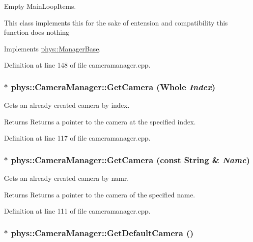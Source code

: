 Empty MainLoopItems. 

This class implements this for the sake of entension and compatibility this function does nothing 

Implements \hyperlink{classphys_1_1ManagerBase_aa9e13a3f7c398b708f0f242610b5abf7}{phys::ManagerBase}.



Definition at line 148 of file cameramanager.cpp.

\hypertarget{classphys_1_1CameraManager_a5147ab2269311bec15100953b7505d4b}{
\subsubsection[{GetCamera}]{ $\ast$ phys::CameraManager::GetCamera ({\bf Whole} {\em Index})}}
\label{d9/d91/classphys_1_1CameraManager_a5147ab2269311bec15100953b7505d4b}


Gets an already created camera by index. 

\begin{DoxyReturn}{Returns}
Returns a pointer to the camera at the specified index. 
\end{DoxyReturn}


Definition at line 117 of file cameramanager.cpp.

\hypertarget{classphys_1_1CameraManager_ad247bd3789c579cba5edb4c00848ac7c}{
\subsubsection[{GetCamera}]{ $\ast$ phys::CameraManager::GetCamera (const {\bf String} \& {\em Name})}}
\label{d9/d91/classphys_1_1CameraManager_ad247bd3789c579cba5edb4c00848ac7c}


Gets an already created camera by namr. 

\begin{DoxyReturn}{Returns}
Returns a pointer to the camera of the specified name. 
\end{DoxyReturn}


Definition at line 111 of file cameramanager.cpp.

\hypertarget{classphys_1_1CameraManager_ad7ef5b6a4ca501729c2d5d107d1bf392}{
\subsubsection[{GetDefaultCamera}]{ $\ast$ phys::CameraManager::GetDefaultCamera ()}}
\label{d9/d91/classphys_1_1CameraManager_ad7ef5b6a4ca501729c2d5d107d1bf392}


